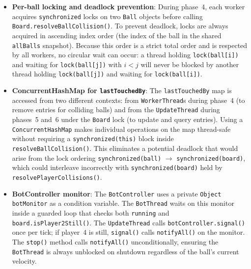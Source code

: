 \documentclass[12pt,a4paper]{article}
\begin{document}
\begin{itemize}
One instance of \texttt{ReusableLatch} is created per game: \texttt{gridLatch}
gates the transition from phase~3 to phase~4. Worker-0 calls
\texttt{gridLatch.open()} after \texttt{grid.build()} completes; all other workers
call \texttt{gridLatch.await()}. The \texttt{UpdateThread} does not participate in
the latch — it proceeds directly from \texttt{barrierPositions} to
\texttt{barrierCollisions}, since it has no work to do during phase~5.
 
The choice of \texttt{ReusableLatch} over a third \texttt{CyclicBarrier} is
deliberate: a \texttt{CyclicBarrier} implies that all parties perform parallel
work and wait for each other, which would misrepresent the asymmetric nature of
grid construction. Using the semantically correct primitive makes the
synchronization structure of the system explicit and self-documenting.

	\item \textbf{Per-ball locking and deadlock prevention}: During phase~4, each worker acquires \texttt{synchronized} locks on two \texttt{Ball} objects before calling\\
\texttt{Board.resolveBallCollision()}. To prevent deadlock, locks are always acquired in ascending index order (the index of the ball in the shared \texttt{allBalls} snapshot). Because this order is a strict total order and is respected by all workers, no circular wait can occur: a thread holding \texttt{lock(ball[i])} and waiting for \texttt{lock(ball[j])} with $i < j$ will never be blocked by another thread holding \texttt{lock(ball[j])} and waiting for \texttt{lock(ball[i])}.

	\item \textbf{ConcurrentHashMap for \texttt{lastTouchedBy}}: The \texttt{lastTouchedBy} map is accessed from two different contexts: from
\texttt{WorkerThread}s during phase~4 (to remove entries for colliding balls) and
from the \texttt{UpdateThread} during phases~5 and~6 under the \texttt{Board} lock
(to update and query entries). Using a \texttt{ConcurrentHashMap} makes individual
operations on the map thread-safe without requiring a \texttt{synchronized(this)}
block inside \texttt{resolveBallCollision()}. This eliminates a potential deadlock
that would arise from the lock ordering \texttt{synchronized(ball)} $\to$
\texttt{synchronized(board)}, which could interleave incorrectly with
\texttt{synchronized(board)} held by\\
\texttt{resolvePlayerCollisions()}.

	\item \textbf{BotController monitor}: The \texttt{BotController} uses a private \texttt{Object botMonitor} as a condition
variable. The \texttt{BotThread} waits on this monitor inside a guarded loop that
checks both \texttt{running} and \texttt{board.isPlayer2Still()}. The
\texttt{UpdateThread} calls \texttt{botController.signal()} once per tick; if
player~4 is still, \texttt{signal()} calls \texttt{notifyAll()} on the monitor.
The \texttt{stop()} method calls \texttt{notifyAll()} unconditionally, ensuring the
\texttt{BotThread} is always unblocked on shutdown regardless of the ball's current
velocity.


\end{itemize}
\end{document}
